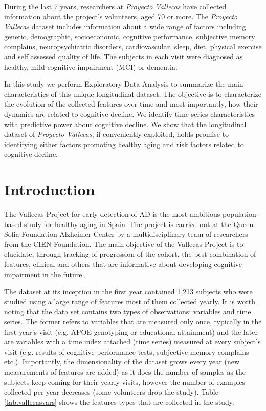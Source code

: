 \documentclass[11pt]{article}
\theoremstyle{definition}
\theoremstyle{remark}
\begin{document}
During the last 7 years, researchers at \emph{Proyecto Vallecas} have collected information about the project's volunteers, aged 70 or more. The \emph{Proyecto Vallecas} dataset includes information about a wide range of factors including genetic, demographic, socioeconomic, cognitive performance, subjective memory complains, neuropsychiatric disorders, cardiovascular, sleep, diet, physical exercise and self assessed quality of life. The subjects in each visit were diagnosed as healthy, mild cognitive impairment (MCI) or dementia. 

In this study we perform Exploratory Data Analysis to summarize the main characteristics of this unique longitudinal dataset. The objective is to characterize the evolution of the collected features over time and most importantly, how their dynamics are related to cognitive decline. 
We identify time series characteristics with predictive power about cognitive decline. We show that the longitudinal dataset of \emph{Proyecto Vallecas}, if conveniently exploited, holds promise to identifying either factors promoting healthy aging and risk factors related to cognitive decline. 
 
\section{Introduction}
\label{se:int}
The Vallecas Project for early detection of AD is the most ambitious population-based study for healthy aging in Spain. The project is carried out at the Queen Sofia Foundation Alzheimer Center by a multidisciplinary team of researchers from the CIEN Foundation. The main objective of the Vallecas Project is to elucidate, through tracking of progression of the cohort, the best combination of features, clinical and others that are informative about developing cognitive impairment in the future. 

The dataset at its inception in the first year contained 1,213 subjects who were studied using a large range of features most of them collected yearly. 
It is worth noting that the data set contains two types of observations: variables and time series. The former refers to variables that are measured only once, typically in the first year's visit (e.g. APOE genotyping or educational attainment) and the later are variables with a time index attached (time series) measured at every subject's visit (e.g. results of cognitive performance tests, subjective memory complains etc.).
Importantly, the dimensionality of the dataset grows every year (new measurements of features are added) as it does the number of samples as the subjects keep coming for their yearly visits, however the number of examples collected per year decreases (some volunteers drop the study). 
Table \ref{tab:vallecasvars} shows the features types that are collected in the study.
\end{document}
